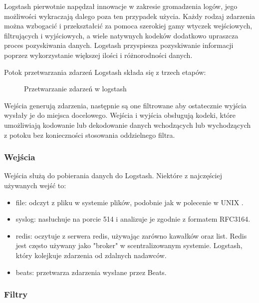 Logstash pierwotnie napędzał innowacje w zakresie gromadzenia logów, jego możliwości wykraczają dalego poza ten przypadek użycia. Każdy rodzaj zdarzenia można wzbogacić i przekształcić za pomoca szerokiej gamy wtyczek wejściowych, filtrujących i wyjściowych, a wiele natywnych kodeków dodatkowo upraszcza proces pozyskiwania danych. Logstash przyspiesza pozyskiwanie informacji poprzez wykorzystanie większej ilości i różnorodności danych\cite{logstashManualIntroduction}.

Potok przetwarzania zdarzeń Logstash składa się z trzech etapów:

\begin{figure}[!htbp]
    \centering
    
    \caption{Przetwarzanie zdarzeń w logstash}
    \label{fig:enter-label}
\end{figure}

Wejścia generują zdarzenia, następnie są one filtrowane aby ostatecznie wyjścia wysłały je do miejsca docelowego. Wejścia i wyjścia obsługują kodeki, które umożliwiają kodowanie lub dekodowanie danych wchodzących lub wychodzących z potoku bez konieczności  stosowania oddzielnego filtra\cite{logstashManualHowItWorks}. 

\subsubsection{Wejścia}

Wejścia służą do pobierania danych do Logstash. Niektóre z najczęściej używanych wejść to:

\begin{itemize}
    \item file: odczyt z pliku w systemie plików, podobnie jak w polecenie w UNIX \cite{logstashManualHowItWorks}.
    \item syslog: nasłuchuje na porcie 514 i analizuje je zgodnie z formatem RFC3164\cite{rfc3164}\cite{logstashManualHowItWorks}.
    \item redis: oczytuje z serwera redis, używając zarówno kawałków oraz list. Redis jest często używany jako "broker" w scentralizowanym systemie. Logstash, który kolejkuje zdarzenia od zdalnych nadawców\cite{logstashManualHowItWorks}.
    \item beats: przetwarza zdarzenia wysłane przez Beats\cite{logstashManualHowItWorks}.
\end{itemize}

\subsubsection{Filtry}

